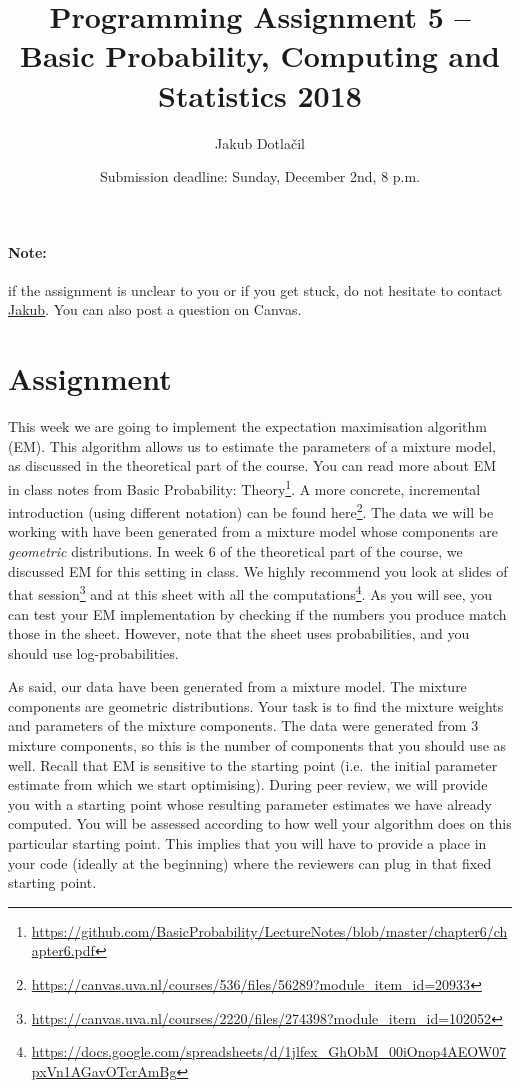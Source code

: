 \documentclass[11pt, a4paper]{article}
\title{Programming Assignment 5 -- Basic Probability, Computing and Statistics 2018}
\author{Jakub Dotla\v{c}il}
\date{Submission deadline: Sunday, December 2nd, 8 p.m.}
\newcommand{\link}[1]{\footnote{\color{blue}\href{#1}{#1}}}
\begin{document}
\maketitle

\paragraph{Note:} if the assignment is unclear to you or if you get stuck, do not hesitate to contact \href{mailto:j.dotlacil@uva.nl}{Jakub}. You can also post a question on Canvas.

\section{Assignment}

This week we are going to implement the expectation maximisation algorithm (EM). 
This algorithm allows us to estimate the parameters of a mixture model, as discussed in the theoretical part of the course.
You can read more about EM in class notes from Basic Probability: Theory\link{https://github.com/BasicProbability/LectureNotes/blob/master/chapter6/chapter6.pdf}. 
A more concrete, incremental introduction (using different notation) can be found here\footnote{\href{https://canvas.uva.nl/courses/536/files/56289?module_item_id=20933}{https://canvas.uva.nl/courses/536/files/56289?module\_item\_id=20933}}.
The data we will be working with have been generated from a mixture model whose components are \emph{geometric} distributions.
In week 6 of the theoretical part of the course, we discussed EM for this setting in class. 
We highly recommend you look at slides of that session\footnote{\href{https://canvas.uva.nl/courses/2220/files/274398?module_item_id=102052}{https://canvas.uva.nl/courses/2220/files/274398?module\_item\_id=102052}} and  at this sheet with all the computations\footnote{\href{https://docs.google.com/spreadsheets/d/1jlfex_GhObM_00iOnop4AEOW07pxVn1AGavOTcrAmBg}{https://docs.google.com/spreadsheets/d/1jlfex\_GhObM\_00iOnop4AEOW07pxVn1AGavOTcrAmBg}}.
As you will see, you can test your EM implementation by checking if the numbers you produce match those in the sheet. 
However, note that the sheet uses probabilities, and you should use log-probabilities.



As said, our data have been generated from a mixture model. 
 The mixture components are geometric distributions. 
 Your task is to find the mixture weights and parameters of the mixture components. 
 The data were generated from 3 mixture components, so this is the number of components that you should use as well. 
Recall that EM is sensitive to the starting point (i.e.\ the initial parameter estimate from which we start optimising). During peer review, we will
provide you with a starting point whose resulting parameter estimates we have already computed. You will be assessed according to how well your
algorithm does on this particular starting point. This implies that you will have to provide a place in your code (ideally at the beginning) where
the reviewers can plug in that fixed starting point.
\end{document}
